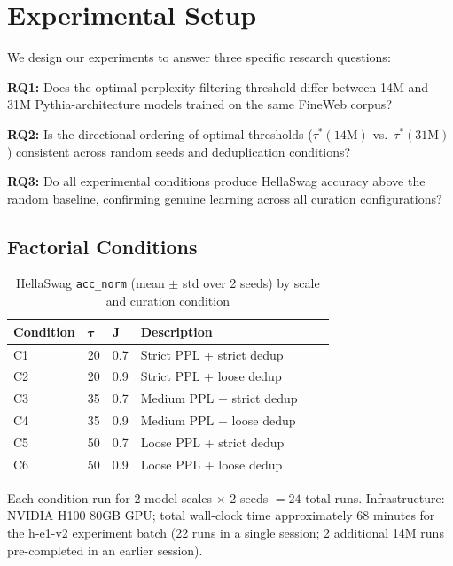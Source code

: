 \section{Experimental Setup}
\label{sec:setup}

We design our experiments to answer three specific research questions:

\textbf{RQ1:} Does the optimal perplexity filtering threshold differ between 14M and 31M Pythia-architecture models trained on the same FineWeb corpus?

\textbf{RQ2:} Is the directional ordering of optimal thresholds ($\tau^*(14\text{M})$ vs.\ $\tau^*(31\text{M})$) consistent across random seeds and deduplication conditions?

\textbf{RQ3:} Do all experimental conditions produce HellaSwag accuracy above the random baseline, confirming genuine learning across all curation configurations?

\subsection{Factorial Conditions}

\begin{table}[h]
\centering
\caption{HellaSwag \texttt{acc\_norm} (mean $\pm$ std over 2 seeds) by scale and curation condition}
\label{tab:conditions}
\begin{tabular}{llllll}
\toprule
\textbf{Condition} & $\boldsymbol{\tau}$ & $\boldsymbol{J}$ & \textbf{Description} \\
\midrule
C1 & 20 & 0.7 & Strict PPL + strict dedup \\
C2 & 20 & 0.9 & Strict PPL + loose dedup \\
C3 & 35 & 0.7 & Medium PPL + strict dedup \\
C4 & 35 & 0.9 & Medium PPL + loose dedup \\
C5 & 50 & 0.7 & Loose PPL + strict dedup \\
C6 & 50 & 0.9 & Loose PPL + loose dedup \\
\bottomrule
\end{tabular}
\end{table}

Each condition run for 2 model scales $\times$ 2 seeds $= 24$ total runs. Infrastructure: NVIDIA H100 80GB GPU; total wall-clock time approximately 68 minutes for the h-e1-v2 experiment batch (22 runs in a single session; 2 additional 14M runs pre-completed in an earlier session).
